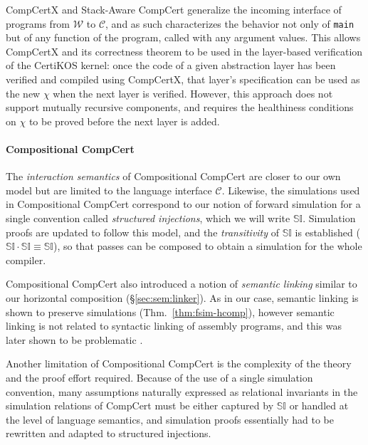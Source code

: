 \documentclass[acmsmall,screen,review,anonymous]{acmart}
\begin{document}
CompCertX \cite{popl15} and
Stack-Aware CompCert \cite{stackaware}
generalize
the incoming interface of programs
from $\mathcal{W}$ to $\mathcal{C}$,
and as such characterizes the behavior
not only of \texttt{main}
but of any function of the program,
called with any argument values.
This allows CompCertX and its correctness theorem
to be used in the layer-based verification of
the CertiKOS kernel:
once the code of a given abstraction layer has been verified
and compiled using CompCertX,
that layer's specification can be used as the new $\chi$
when the next layer is verified.
However,
this approach does not support
mutually recursive components,
and requires the healthiness conditions on $\chi$
to be proved before the next layer is added.


\paragraph{Compositional CompCert} %

The \emph{interaction semantics} of
Compositional CompCert \cite{compcompcert}
are closer to our own model
but are limited to the language interface $\mathcal{C}$.
Likewise, the simulations used in Compositional CompCert
correspond to our notion of forward simulation
for a single convention called \emph{structured injections},
which we will write $\mathbb{SI}$.
Simulation proofs are updated to follow this model,
and the \emph{transitivity} of $\mathbb{SI}$ is established
($\mathbb{SI} \cdot \mathbb{SI} \equiv \mathbb{SI}$),
so that passes can be composed
to obtain a simulation for the whole compiler.

Compositional CompCert also introduced a notion of \emph{semantic linking}
similar to our horizontal composition
(\S\ref{sec:sem:linker}).
As in our case,
semantic linking is shown to preserve simulations
(Thm.~\ref{thm:fsim-hcomp}),
however semantic linking is not related to
syntactic linking of assembly programs,
and this was later shown to be problematic \cite{compcertm}.

Another limitation of Compositional CompCert
is the complexity of the theory
and the proof effort required.
Because of the use of a single simulation convention,
many assumptions naturally expressed as
relational invariants in the simulation relations of CompCert
must be either captured by $\mathbb{SI}$
or handled at the level of language semantics,
and simulation proofs
essentially had to be rewritten and adapted to
structured injections.
\end{document}
